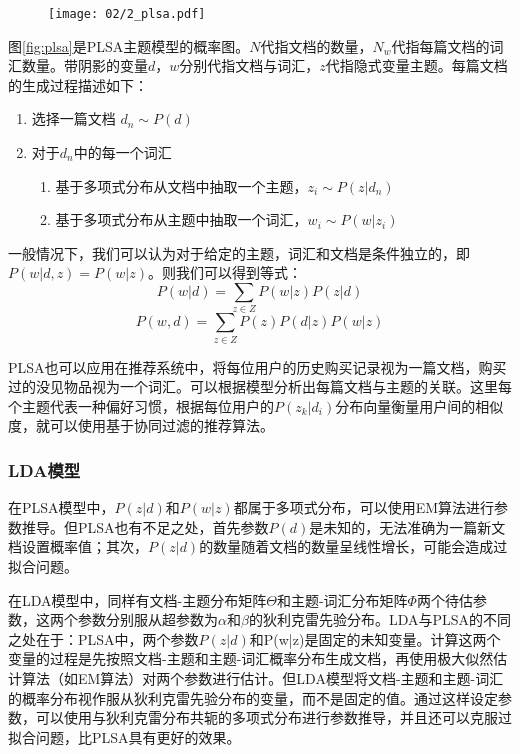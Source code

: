 \begin{figure}
 \centering
 \texttt{[image: 02/2\_plsa.pdf]}
\end{figure}

图\ref{fig:plsa}是PLSA主题模型的概率图。$N$代指文档的数量，$N_w$代指每篇文档的词汇数量。带阴影的变量$d$，$w$分别代指文档与词汇，$z$代指隐式变量主题。每篇文档的生成过程描述如下：

\begin{enumerate}
\item 选择一篇文档 $d_n \sim P(d)$
\item 对于$d_n$中的每一个词汇
       \begin{enumerate}[fullwidth,itemindent=1em,label=(\alph*)]
       \item 基于多项式分布从文档中抽取一个主题，$z_i \sim P(z|d_n)$
       \item 基于多项式分布从主题中抽取一个词汇，$w_i \sim P(w|z_i)$
       \end{enumerate}
\end{enumerate}

一般情况下，我们可以认为对于给定的主题，词汇和文档是条件独立的，即$P(w|d,z) = P(w|z)$。则我们可以得到等式：
\begin{equation}
	P(w|d) = \sum_{z\in Z}P(w|z)P(z|d)
\end{equation}
\begin{equation}
	P(w,d) = \sum_{z\in Z}P(z)P(d|z)P(w|z)
\end{equation}

PLSA也可以应用在推荐系统中，将每位用户的历史购买记录视为一篇文档，购买过的没见物品视为一个词汇。可以根据模型分析出每篇文档与主题的关联。这里每个主题代表一种偏好习惯，根据每位用户的$P(z_k|d_i)$分布向量衡量用户间的相似度，就可以使用基于协同过滤的推荐算法。

\subsubsection{LDA模型}


在PLSA模型中，$P(z|d)$和$P(w|z)$都属于多项式分布，可以使用EM算法进行参数推导。但PLSA也有不足之处，首先参数$P(d)$是未知的，无法准确为一篇新文档设置概率值；其次，$P(z|d)$的数量随着文档的数量呈线性增长，可能会造成过拟合问题。

在LDA\parencite{blei2003latent}模型中，同样有文档-主题分布矩阵$\Theta$和主题-词汇分布矩阵$\Phi$两个待估参数，这两个参数分别服从超参数为$\alpha$和$\beta$的狄利克雷先验分布。LDA与PLSA的不同之处在于：PLSA中，两个参数$P(z|d)$和P(w|z)是固定的未知变量。计算这两个变量的过程是先按照文档-主题和主题-词汇概率分布生成文档，再使用极大似然估计算法（如EM算法）对两个参数进行估计。但LDA模型将文档-主题和主题-词汇的概率分布视作服从狄利克雷先验分布的变量，而不是固定的值。通过这样设定参数，可以使用与狄利克雷分布共轭的多项式分布进行参数推导，并且还可以克服过拟合问题，比PLSA具有更好的效果。

